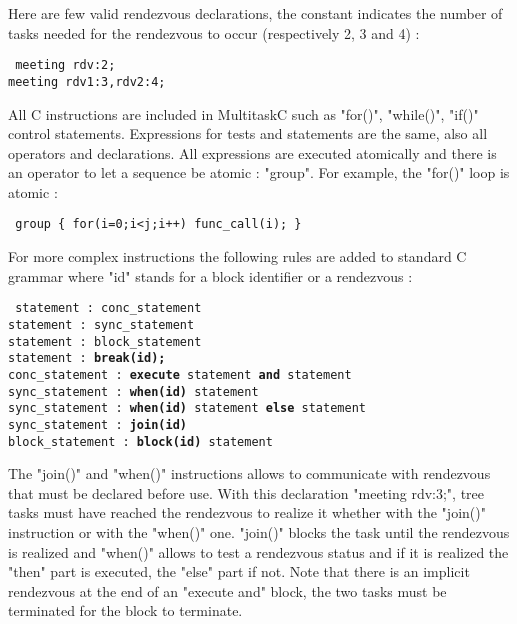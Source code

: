 \documentclass[10pt]{report}
\begin{document}
Here are few valid rendezvous declarations, the constant indicates the number of tasks needed for the rendezvous to
occur (respectively 2, 3 and 4) :

\begin{table}[h!]
\tt
\footnotesize
meeting rdv:2;\\
meeting rdv1:3,rdv2:4;\\
\end{table}

All C instructions are included in MultitaskC such as "for()", "while()", "if()" control statements. Expressions for
tests and statements are the same, also all operators and declarations. All expressions are executed atomically and
there is an operator to let a sequence be atomic : "group". For example, the "for()" loop is atomic :

\begin{table}[h!]
\tt
\footnotesize
group \{ for(i=0;i<j;i++) func\_call(i); \}
\end{table}

For more complex instructions the following rules are added to standard C grammar where "id" stands for a block
identifier or a rendezvous :

\begin{table}[h!]
\tt
\footnotesize
statement : conc\_statement\\
statement : sync\_statement\\
statement : block\_statement\\
statement : {\bf break(id);}\\
conc\_statement : {\bf execute} statement {\bf and} statement\\
sync\_statement : {\bf when(id)} statement\\
sync\_statement : {\bf when(id)} statement {\bf else} statement\\
sync\_statement : {\bf join(id)}\\
block\_statement : {\bf block(id)} statement\\
\end{table}

The "join()" and "when()" instructions allows to communicate with rendezvous that must be declared before use.
With this declaration "meeting rdv:3;", tree tasks must have reached the rendezvous to realize it whether with
the "join()" instruction or with the "when()" one. "join()" blocks the task until the rendezvous is realized and
"when()" allows to test a rendezvous status and if it is realized the "then" part is executed, the "else" part
if not. Note that there is an implicit rendezvous at the end of an "execute and" block, the two tasks must
be terminated for the block to terminate.
\end{document}
